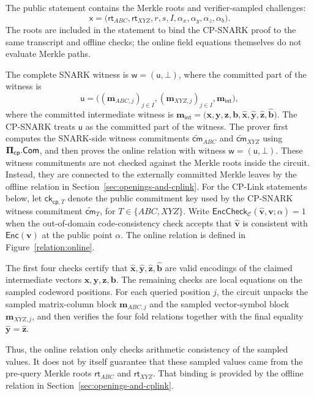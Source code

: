 \documentclass[conference,compsoc]{IEEEtran}
\newcommand{\cm}{\textsf{cm}}
\newcommand{\rt}{\textsf{rt}}
\newcommand{\ck}{\textsf{ck}}
\newcommand{\vect}{\mathbf}         %
\renewcommand{\enc}{\mathsf{Enc}}   %
\newcommand{\bPi}{{\bf \Pi}}
\newcommand{\com}{{\sf Com}}
\newcommand{\cp}{{\mathsf{cp}}}
\renewcommand{\ck}{{\textsf{ck}}}
\newcommand{\stmt}{\mathsf{x}}      %
\newcommand{\wit}{\mathsf{w}}       %
\newcommand{\comwit}{\mathsf{u}}
\theoremstyle{plain}
\theoremstyle{definition}
\theoremstyle{remark}
\begin{document}
The public statement contains the Merkle roots and verifier-sampled
challenges:
\[
\stmt = \big( \rt_{ABC},\rt_{XYZ},r, \ensuremath{s}, I,\alpha_x,\alpha_y,\alpha_z, \ensuremath{\alpha_b}
  \big).
\]
The roots are included in the statement to bind the CP-SNARK proof to the same
transcript and offline checks; the online field equations themselves do not
evaluate Merkle paths.

The complete SNARK witness is
  $\wit=(\comwit,\ensuremath{\bot})$,
where the committed part of the witness is
\[
\comwit = \big( (\vect{m}_{ABC,j})_{j\in I},(\vect{m}_{XYZ,j})_{j\in I}\ensuremath{,\vect m_{\mathsf{int}}} \big),
\]
where the committed intermediate witness is
  $\ensuremath{\vect m_{\mathsf{int}}}
  =
  \big(
    \vect{x},\vect{y},\vect{z},\ensuremath{\vect{b}},
    \widehat{\vect{x}},\widehat{\vect{y}},\widehat{\vect{z}}, \ensuremath{\widehat{\vect{b}}}
  \big).$
The CP-SNARK treats \(\comwit\) as the committed part of the witness.  The
prover first computes the SNARK-side witness commitments
\(\widetilde{\cm}_{ABC}\) and \(\widetilde{\cm}_{XYZ}\) using
\(\bPi_{\cp}.\com\), and then proves the online relation with witness
\(\wit=(\comwit,\ensuremath{\bot})\).  These witness commitments are not checked against
the Merkle roots inside the circuit.  Instead, they are connected to the
externally committed Merkle leaves by the offline relation in
Section~\ref{sec:openings-and-cplink}.
For the CP-Link statements below, let \(\ck_{\cp,T}\) denote the public
commitment key used by the CP-SNARK witness commitment
\(\widetilde{\cm}_{T}\), for \(T\in\{ABC,XYZ\}\).
Write
  $\mathsf{EncCheck}_{\mathcal{C}}(\widehat{\vect{v}},\vect{v};\alpha)=1$
when the out-of-domain code-consistency check accepts that
\(\widehat{\vect{v}}\) is consistent with \(\enc(\vect{v})\) at the public
point \(\alpha\).  The online relation is defined in
Figure~\ref{relation:online}.


The first four checks certify that
\(\widehat{\vect{x}},\widehat{\vect{y}},\widehat{\vect{z}}, \ensuremath{\widehat{\vect{b}}}\) are valid
encodings of the claimed intermediate vectors
\(\vect{x},\vect{y},\vect{z}, \ensuremath{\vect{b}}\).  The remaining checks are local equations on the
sampled codeword positions.  For each queried position \(j\), the circuit
unpacks the sampled matrix-column block \(\vect{m}_{ABC,j}\) and the sampled
vector-symbol block \(\vect{m}_{XYZ,j}\), and then verifies the four fold
relations together with the final equality
\(\widehat{\vect{y}}=\widehat{\vect{z}}\).

Thus, the online relation only checks arithmetic consistency of the sampled
values.  It does not by itself guarantee that these sampled values came from
the pre-query Merkle roots \(\rt_{ABC}\) and \(\rt_{XYZ}\).  That binding is
provided by the offline relation in
Section~\ref{sec:openings-and-cplink}.
\end{document}
